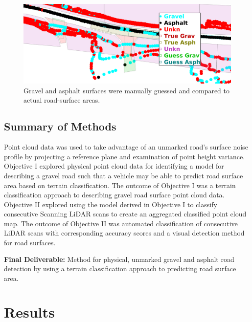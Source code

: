 \documentclass[numbered,pdftex]{ohio-etd}
\begin{document}
{{{{{				\begin{figure}[H]
					\centering
					\includegraphics[width=0.9\linewidth]{Defense_Images/rm_db_4_overlap_reredux}
					\caption[Projected Guess vs Truth]{Gravel and asphalt surfaces were manually guessed and compared to actual road-surface areas. }
					\label{fig:rm_db_4_toc}
				\end{figure}	
	
			}
		
		} %

	} %
	
} %


\newpage
	
	
	\section{Summary of Methods}\label{sec:summary-of-methods}
	{
		
		{Point cloud data was used to take advantage of an unmarked road's surface noise profile by projecting a reference plane and examination of point height variance. Objective I explored physical point cloud data for identifying a model for describing a gravel road such that a vehicle may be able to predict road surface area based on terrain classification. The outcome of Objective I was a terrain classification approach to describing gravel road surface point cloud data. Objective II explored using the model derived in Objective I to classify consecutive Scanning LiDAR scans to create an aggregated classified point cloud map. The outcome of Objective II was automated classification of consecutive LiDAR scans with corresponding accuracy scores and a visual detection method for road surfaces.}
		 
		{\textbf{Final Deliverable:} Method for physical, unmarked gravel and asphalt road detection by using a terrain classification approach to predicting road surface area.}
		
	} %

\chapter{Results}{
	
}}
\end{document}
